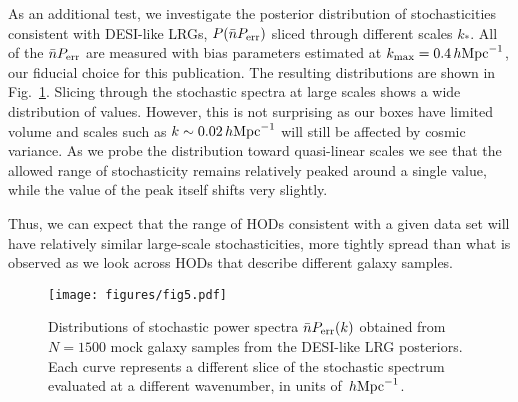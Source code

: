 \documentclass[fleqn,usenatbib]{mnras}
\newcommand{\ihmpc}{\,h{\rm Mpc}^{-1}}
\begin{document}
As an additional test, we investigate the posterior distribution of stochasticities consistent with DESI-like LRGs, $P(\bar{n}P_{\rm err})$ sliced through different scales $k_*$. All of the $\bar{n}P_{\rm err}$ are measured with bias parameters estimated at $k_{\rm max} = 0.4 \ihmpc$, our fiducial choice for this publication. The resulting distributions are shown in Fig.~\ref{fig:nperrdistrib}. Slicing through the stochastic spectra at large scales shows a wide distribution of values. However, this is not surprising as our boxes have limited volume and scales such as $k \sim 0.02 \ihmpc$ will still be affected by cosmic variance. As we probe the distribution toward quasi-linear scales we see that the allowed range of stochasticity remains relatively peaked around a single value, while the value of the peak itself shifts very slightly. \par
Thus, we can expect that the range of HODs consistent with a given data set will have relatively similar large-scale stochasticities, more tightly spread than what is observed as we look across HODs that describe different galaxy samples. 
\begin{figure}
    \centering
    \texttt{[image: figures/fig5.pdf]}
    \caption{Distributions of stochastic power spectra $\bar{n}P_{\rm err}(k)$ obtained from $N=1500$ mock galaxy samples from the DESI-like LRG posteriors. Each curve represents a different slice of the stochastic spectrum evaluated at a different wavenumber, in units of $\ihmpc$.}
    \label{fig:nperrdistrib} 
\end{figure}
\end{document}
